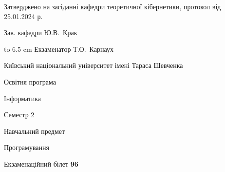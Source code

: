 \documentclass[12pt, ukrainian]{article}
\begin{document}
{\smallskip\smallskip \begin {scriptsize} Затверджено на засіданні кафедри теоретичної кібернетики, протокол   від   25.01.2024 р.\par\smallskip\smallskip\smallskip\smallskip
{\parbox {6.5 cm} {Зав. кафедри \dotfill Ю.В.~Крак}}\hspace {0.7cm} {\hbox to 6.5 cm { Екзаменатор \dotfill Т.О.~Карнаух}} \end{scriptsize}}
\newpage
{{\begin {scriptsize}\par
{ \center  Київський національний університет імені Тараса Шевченка \par}
{\parbox {5 cm}{Освітня програма \hfill}{\parbox {7 cm}{Інформатика\hfill}}\parbox {6 cm}{\hfill Семестр 2}}\par
{\parbox {5 cm} {Навчальний предмет \hfill}\parbox {7 cm}{Програмування \hfill}\parbox {6cm}{\hfill}\par}\vspace{-15pt} \end{scriptsize}}{\center Екзаменаційний білет \No \textbf { 96 }\par}}
\end{document}
